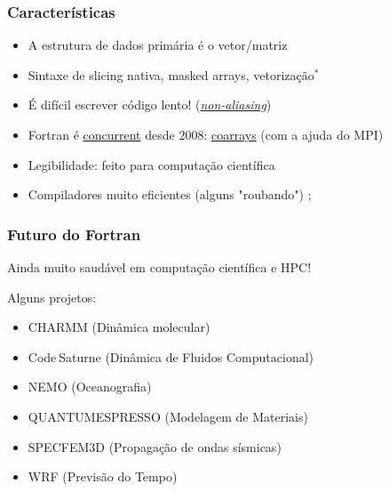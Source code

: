 \documentclass{beamer}
\begin{document}
\begin{darkframes}
  \begin{frame}[label=features]
    \frametitle{Características}
    \begin{itemize}
    \item A estrutura de dados primária é o vetor/matriz
    \item Sintaxe de slicing nativa, masked arrays, vetorização$^*$
    \item É difícil escrever código lento! (\hyperlink{aliasing}{\emph{non-aliasing}})
    \item Fortran é \href{https://en.wikipedia.org/wiki/Concurrent_computing}{concurrent} desde 2008: \href{https://en.wikipedia.org/wiki/Coarray_Fortran}{coarrays} (com a ajuda do MPI)
    \item Legibilidade: feito para computação científica
    \item Compiladores muito eficientes (alguns "roubando") \hyperlink{compilers}{}; 
    \end{itemize}
  \end{frame}
  
  \begin{frame}
    \frametitle{Futuro do Fortran}
    Ainda muito saudável em computação científica e HPC!

    \vfill
    Alguns projetos:
    \begin{itemize}
    \item CHARMM (Dinâmica molecular)
    \item Code$_{\ }$Saturne (Dinâmica de Fluidos Computacional)
    \item NEMO (Oceanografia)
    \item QUANTUMESPRESSO (Modelagem de Materiais)
    \item SPECFEM3D (Propagação de ondas sísmicas)
    \item WRF (Previsão do Tempo)
    \end{itemize}
  \end{frame}
  

\end{darkframes}
\end{document}
